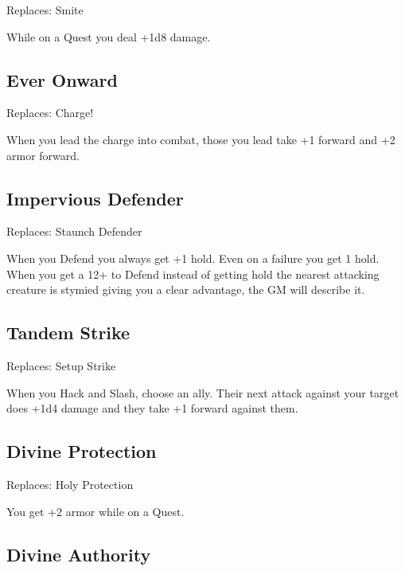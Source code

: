 Replaces: Smite

 

While on a Quest you deal +1d8 damage.

 
\subsection{Ever Onward}   
 

Replaces: Charge!

 

When you lead the charge into combat, those you lead take +1 forward and +2 armor forward.

 
\subsection{Impervious Defender}    
 

Replaces: Staunch Defender

 

When you Defend you always get +1 hold. Even on a failure you get 1 hold. When you get a 12+ to Defend instead of getting hold the nearest attacking creature is stymied giving you a clear advantage, the GM will describe it.

 
\subsection{Tandem Strike}    
 

Replaces: Setup Strike

 

When you Hack and Slash, choose an ally. Their next attack against your target does +1d4 damage and they take +1 forward against them.

 
\subsection{Divine Protection}    
 

Replaces: Holy Protection

 

You get +2 armor while on a Quest.

 
\subsection{Divine Authority}    
 

